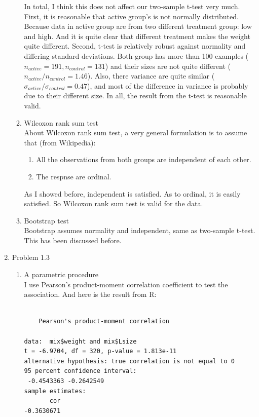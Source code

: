 \documentclass[12pt]{article}
\begin{document}
\begin{enumerate}
\begin{enumerate}
    In total, I think this does not affect our two-sample t-test
    very much. First, it is reasonable that active group's is not
    normally distributed. Because data in active group are from two
    different treatment group: low and high. And it is quite clear
    that different treatment makes the weight quite
    different. Second, t-test is relatively robust against normality
    and differing standard deviations. Both group has more than 100
    examples ($n_{active} = 191, n_{control} = 131 $) and their sizes
    are not quite different ($n_{active} / n_{control} = 1.46 $). Also,
    there variance are quite similar ($\sigma_{active} /
    \sigma_{control} = 0.47 $), and most of the difference in
    variance is probably due to their different size. In all,
    the result from the t-test is reasonable valid.

  \item Wilcoxon rank sum test\\
    About Wilcoxon rank sum test, a very general formulation is to
    assume that (from Wikipedia):
    \begin{enumerate}
      \item All the observations from both groups are independent of
        each other.
      \item The respnse are ordinal.
    \end{enumerate}
    As I showed before, independent is satisfied. As to ordinal, it
    is easily satisfied. So Wilcoxon rank sum test is valid for the
    data.

  \item Bootstrap test\\
    Bootstrap assumes normality and independent, same as two-sample
    t-test. This has been discussed before.

  \end{enumerate}

\item Problem 1.3
  \begin{enumerate}
  \item A parametric procedure\\
    I use Pearson's product-moment correlation coefficient to test the
    association. And here is the result from R:

\begin{verbatim}

	Pearson's product-moment correlation

data:  mix$weight and mix$Lsize 
t = -6.9704, df = 320, p-value = 1.813e-11
alternative hypothesis: true correlation is not equal to 0 
95 percent confidence interval:
 -0.4543363 -0.2642549 
sample estimates:
       cor 
-0.3630671 


\end{verbatim}
\end{enumerate}
\end{enumerate}
\end{document}
